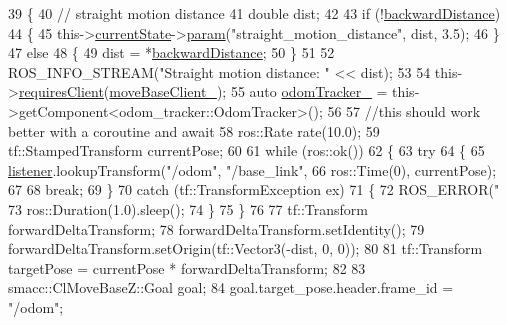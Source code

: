 \begin{DoxyCode}
39     \{
40         \textcolor{comment}{// straight motion distance}
41         \textcolor{keywordtype}{double} dist;
42 
43         \textcolor{keywordflow}{if} (!\hyperlink{classsm__dance__bot_1_1CbNavigateBackwards_ace20c1dfa7b8e84c754aedbd3dd00fdf}{backwardDistance})
44         \{
45             this->\hyperlink{classsmacc_1_1SmaccClientBehavior_af76fc9b877542ed5caf033f820c107d0}{currentState}->\hyperlink{classsmacc_1_1ISmaccState_a4982f2187ed6da337462721146e8ef70}{param}(\textcolor{stringliteral}{"straight\_motion\_distance"}, dist, 3.5);
46         \}
47         \textcolor{keywordflow}{else}
48         \{
49             dist = *\hyperlink{classsm__dance__bot_1_1CbNavigateBackwards_ace20c1dfa7b8e84c754aedbd3dd00fdf}{backwardDistance};
50         \}
51 
52         ROS\_INFO\_STREAM(\textcolor{stringliteral}{"Straight motion distance: "} << dist);
53 
54         this->\hyperlink{classsmacc_1_1SmaccClientBehavior_a917f001e763a1059af337bf4e164f542}{requiresClient}(\hyperlink{classsm__dance__bot_1_1CbNavigateBackwards_ae4cd503172b4f5c7b0dba49aec08885e}{moveBaseClient\_});
55         \textcolor{keyword}{auto} \hyperlink{classsm__dance__bot_1_1CbNavigateBackwards_a5361e3e58c18fc428c00bc50977ee715}{odomTracker\_} = this->getComponent<odom\_tracker::OdomTracker>();
56         
57         \textcolor{comment}{//this should work better with a coroutine and await}
58         ros::Rate rate(10.0);
59         tf::StampedTransform currentPose;
60 
61         \textcolor{keywordflow}{while} (ros::ok())
62         \{
63             \textcolor{keywordflow}{try}
64             \{
65                 \hyperlink{classsm__dance__bot_1_1CbNavigateBackwards_a4ec9af0d5b94c5e0654a768c36bec85b}{listener}.lookupTransform(\textcolor{stringliteral}{"/odom"}, \textcolor{stringliteral}{"/base\_link"},
66                                          ros::Time(0), currentPose);
67 
68                 \textcolor{keywordflow}{break};
69             \}
70             \textcolor{keywordflow}{catch} (tf::TransformException ex)
71             \{
72                 ROS\_ERROR(\textcolor{stringliteral}{"%
73                 ros::Duration(1.0).sleep();
74             \}
75         \}
76 
77         tf::Transform forwardDeltaTransform;
78         forwardDeltaTransform.setIdentity();
79         forwardDeltaTransform.setOrigin(tf::Vector3(-dist, 0, 0));
80 
81         tf::Transform targetPose = currentPose * forwardDeltaTransform;
82 
83         smacc::ClMoveBaseZ::Goal goal;
84         goal.target\_pose.header.frame\_id = \textcolor{stringliteral}{"/odom"};
}
\end{DoxyCode}
